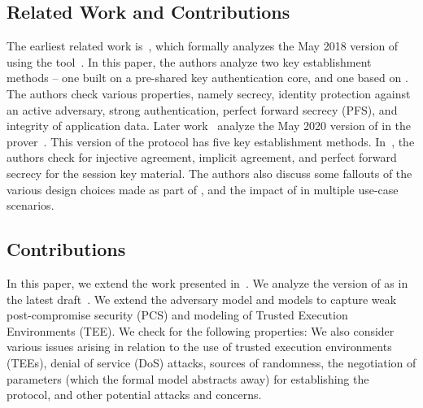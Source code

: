 \subsection{Related Work and Contributions}
\label{sub:related}
The earliest related work is~\cite{DBLP:conf/secsr/BruniJPS18}, which formally analyzes the May 2018 version of \mEdhoc{} using the \mProverif{} tool~\cite{DBLP:conf/csfw/Blanchet01}. 
%
In this paper, the authors analyze two key establishment methods -- one built on
a pre-shared key authentication core, and one based on \mSigma{}. 
%
The authors check  various properties, namely secrecy, identity protection against an active adversary, strong authentication, perfect forward secrecy (PFS), and integrity of application data. 
%
Later work~\cite{Norr21} analyze the May 2020 version of \mEdhoc{} in the \mTamarin{} prover~\cite{DBLP:conf/cav/MeierSCB13}. 
%
This version of the protocol has five key establishment methods. 
%
In~\cite{Norr21}, the authors check for injective agreement, implicit agreement, and perfect forward secrecy for the session key material. 
%
The authors also discuss some fallouts of the various design choices made as part of \mEdhoc{}, and the impact of \mEdhoc{} in multiple use-case scenarios.
%
%

\subsection{Contributions}
\label{sec:contributions}
In this paper, we extend the work presented in~\cite{Norr21}. 
%
We analyze the version of \mEdhoc{} as in the latest draft~\cite{}.
%
We extend the adversary model and \mTamarin{} models to capture weak
post-compromise security (PCS) and modeling of Trusted Execution Environments
(TEE).
%
We check for the following properties: 
%
We also consider various issues arising in relation to the use of trusted execution environments (TEEs), denial of service (DoS) attacks, sources of randomness, the negotiation of parameters (which the formal model abstracts away) for establishing the protocol, and other potential attacks and concerns.
%



